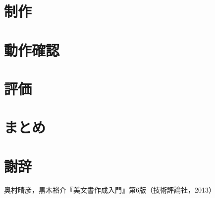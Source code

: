 \documentclass[11pt,uplatex]{jsarticle}
\begin{document}
\date{平成28年1月27日}

\mokuji





\section{制作}

\section{動作確認}

\section{評価}

\section{まとめ}

\section{謝辞}

\begin{thebibliography}{9}
奥村晴彦，黒木裕介『\LaTeXe 美文書作成入門』第6版（技術評論社，2013）

\end{thebibliography}
\end{document}
